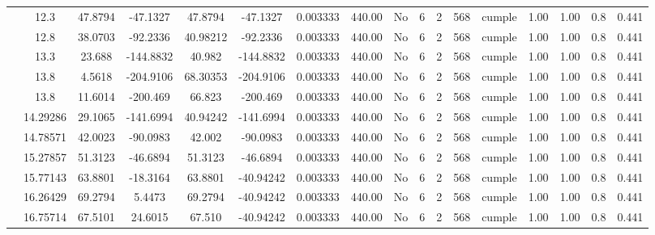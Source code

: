 \begin{table}[H]
{\begin{tabular}{|c|c|c|c|c|c|c|c|c|c|c|c|c|c|c|c|c|}
\cline{2-17}        & 12.3 & 47.8794 & -47.1327 & 47.8794 & -47.1327 & 0.003333 & 440.00 & No  & 6   & 2   & 568 & \cellcolor[rgb]{ .776,  .937,  .808}cumple & 1.00 & 1.00 & 0.8 & 0.441 \bigstrut\\
\cline{2-17}        & 12.8 & 38.0703 & -92.2336 & 40.98212 & -92.2336 & 0.003333 & 440.00 & No  & 6   & 2   & 568 & \cellcolor[rgb]{ .776,  .937,  .808}cumple & 1.00 & 1.00 & 0.8 & 0.441 \bigstrut\\
\cline{2-17}        & 13.3 & 23.688 & -144.8832 & 40.982 & -144.8832 & 0.003333 & 440.00 & No  & 6   & 2   & 568 & \cellcolor[rgb]{ .776,  .937,  .808}cumple & 1.00 & 1.00 & 0.8 & 0.441 \bigstrut\\
\cline{2-17}        & \cellcolor[rgb]{ .851,  .882,  .949}13.8 & 4.5618 & -204.9106 & 68.30353 & -204.9106 & 0.003333 & 440.00 & No  & 6   & 2   & 568 & \cellcolor[rgb]{ .776,  .937,  .808}cumple & 1.00 & 1.00 & 0.8 & 0.441 \bigstrut\\
\cline{2-17}        & \cellcolor[rgb]{ .851,  .882,  .949}13.8 & 11.6014 & -200.469 & 66.823 & -200.469 & 0.003333 & 440.00 & No  & 6   & 2   & 568 & \cellcolor[rgb]{ .776,  .937,  .808}cumple & 1.00 & 1.00 & 0.8 & 0.441 \bigstrut\\
\cline{2-17}        & 14.29286 & 29.1065 & -141.6994 & 40.94242 & -141.6994 & 0.003333 & 440.00 & No  & 6   & 2   & 568 & \cellcolor[rgb]{ .776,  .937,  .808}cumple & 1.00 & 1.00 & 0.8 & 0.441 \bigstrut\\
\cline{2-17}        & 14.78571 & 42.0023 & -90.0983 & 42.002 & -90.0983 & 0.003333 & 440.00 & No  & 6   & 2   & 568 & \cellcolor[rgb]{ .776,  .937,  .808}cumple & 1.00 & 1.00 & 0.8 & 0.441 \bigstrut\\
\cline{2-17}        & 15.27857 & 51.3123 & -46.6894 & 51.3123 & -46.6894 & 0.003333 & 440.00 & No  & 6   & 2   & 568 & \cellcolor[rgb]{ .776,  .937,  .808}cumple & 1.00 & 1.00 & 0.8 & 0.441 \bigstrut\\
\cline{2-17}        & 15.77143 & 63.8801 & -18.3164 & 63.8801 & -40.94242 & 0.003333 & 440.00 & No  & 6   & 2   & 568 & \cellcolor[rgb]{ .776,  .937,  .808}cumple & 1.00 & 1.00 & 0.8 & 0.441 \bigstrut\\
\cline{2-17}        & 16.26429 & 69.2794 & 5.4473 & 69.2794 & -40.94242 & 0.003333 & 440.00 & No  & 6   & 2   & 568 & \cellcolor[rgb]{ .776,  .937,  .808}cumple & 1.00 & 1.00 & 0.8 & 0.441 \bigstrut\\
\cline{2-17}        & 16.75714 & 67.5101 & 24.6015 & 67.510 & -40.94242 & 0.003333 & 440.00 & No  & 6   & 2   & 568 & \cellcolor[rgb]{ .776,  .937,  .808}cumple & 1.00 & 1.00 & 0.8 & 0.441 \bigstrut\\

\end{tabular}}
\end{table}
